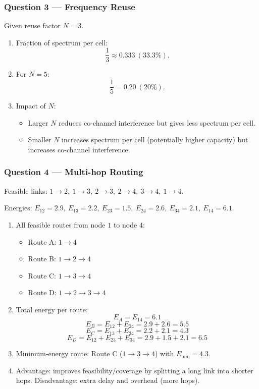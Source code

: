 \documentclass[11pt,a4paper]{article}
\begin{document}
\subsubsection*{Question 3 --- Frequency Reuse}
Given reuse factor $N=3$.

\begin{enumerate}[label=\alph*.]
    \item Fraction of spectrum per cell:
    \[
    \frac{1}{3}\approx 0.333\ (33.3\%).
    \]
    \item For $N=5$:
    \[
    \frac{1}{5}=0.20\ (20\%).
    \]
    \item Impact of $N$:
    \begin{itemize}
        \item Larger $N$ reduces co-channel interference but gives less spectrum per cell.
        \item Smaller $N$ increases spectrum per cell (potentially higher capacity) but increases co-channel interference.
    \end{itemize}
    
\end{enumerate}

\subsubsection*{Question 4 --- Multi-hop Routing}
Feasible links: $1\to 2,\ 1\to 3,\ 2\to 3,\ 2\to 4,\ 3\to 4,\ 1\to 4$.

Energies: $E_{12}=2.9,\ E_{13}=2.2,\ E_{23}=1.5,\ E_{24}=2.6,\ E_{34}=2.1,\ E_{14}=6.1$.

\begin{enumerate}[label=\alph*.]
    \item All feasible routes from node $1$ to node $4$:
    \begin{itemize}
        \item Route A: $1\to 4$
        \item Route B: $1\to 2\to 4$
        \item Route C: $1\to 3\to 4$
        \item Route D: $1\to 2\to 3\to 4$
    \end{itemize}
    \item Total energy per route:
    \[
    E_A=E_{14}=6.1
    \]
    \[
    E_B=E_{12}+E_{24}=2.9+2.6=5.5
    \]
    \[
    E_C=E_{13}+E_{34}=2.2+2.1=4.3
    \]
    \[
    E_D=E_{12}+E_{23}+E_{34}=2.9+1.5+2.1=6.5
    \]
    \item Minimum-energy route: Route C ($1\to 3\to 4$) with $E_{\min}=4.3$.
    \item Advantage: improves feasibility/coverage by splitting a long link into shorter hops. Disadvantage: extra delay and overhead (more hops).
\end{enumerate}
\end{document}
